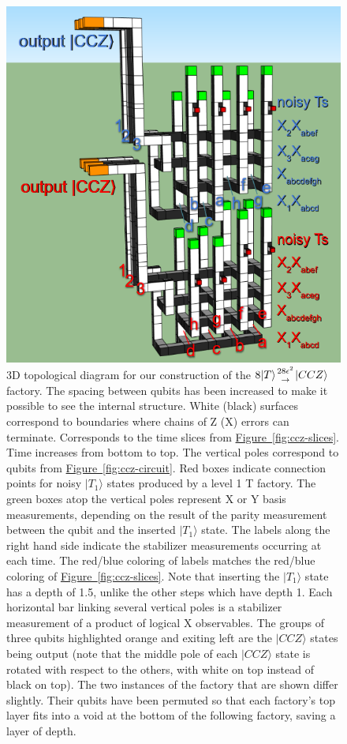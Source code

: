 \documentclass[superscriptaddress,notitlepage,longbibliography]{revtex4-1}
\newcommand{\fig}[1]{\hyperref[fig:#1]{Figure~\ref*{fig:#1}}}
\newcommand{\factory}[3]{$#1 \genfrac{}{}{0pt}{}{#2}{\rightarrow} {#3}$ factory}
\begin{document}
\begin{figure}[ht]
  \label{fig:ccz-3d}
  \includegraphics[width=\textwidth,height=\dimexpr\textheight-14\baselineskip,keepaspectratio]{ccz-3d.png}
  \caption{
    3D topological diagram for our construction of the \factory{8|T\rangle}{28\epsilon^2}{|CCZ\rangle}.
    The spacing between qubits has been increased to make it possible to see the internal structure.
    White (black) surfaces correspond to boundaries where chains of Z (X) errors can terminate.
    Corresponds to the time slices from \fig{ccz-slices}.
    Time increases from bottom to top.
    The vertical poles correspond to qubits from \fig{ccz-circuit}.
    Red boxes indicate connection points for noisy $|T_1\rangle$ states produced by a level 1 T factory.
    The green boxes atop the vertical poles represent X or Y basis measurements, depending on the result of the parity measurement between the qubit and the inserted $|T_1\rangle$ state.
    The labels along the right hand side indicate the stabilizer measurements occurring at each time.
    The red/blue coloring of labels matches the red/blue coloring of \fig{ccz-slices}.
    Note that inserting the $|T_1\rangle$ state has a depth of 1.5, unlike the other steps which have depth 1.
    Each horizontal bar linking several vertical poles is a stabilizer measurement of a product of logical X observables.
    The groups of three qubits highlighted orange and exiting left are the $|CCZ\rangle$ states being output (note that the middle pole of each $|CCZ\rangle$ state is rotated with respect to the others, with white on top instead of black on top).
    The two instances of the factory that are shown differ slightly.
    Their qubits have been permuted so that each factory's top layer fits into a void at the bottom of the following factory, saving a layer of depth.
  }
\end{figure}
\end{document}
